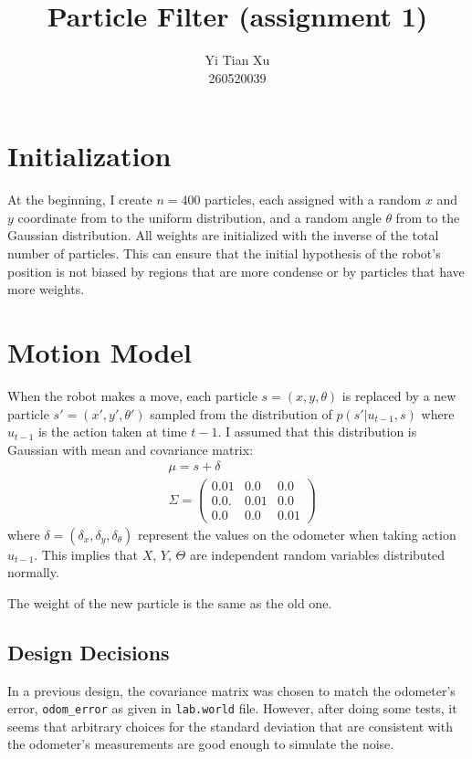 \documentclass[10pt]{article}
\title{Particle Filter (assignment 1)}
\author{Yi Tian Xu\\260520039}
\begin{document}
\maketitle

\section{Initialization}
At the beginning, I create $n=400$ particles, each assigned with a random $x$ and $y$ coordinate from to the uniform distribution, and a random angle $\theta$ from to the Gaussian distribution. All weights are initialized with the inverse of the total number of particles. This can ensure that the initial hypothesis of the robot's position is not biased by regions that are more condense or by particles that have more weights. 

\section{Motion Model}
When the robot makes a move, each particle $s = (x, y, \theta)$ is replaced by a new particle $s' = (x', y', \theta')$ sampled from the distribution of $p(s'|u_{t-1}, s)$ where $u_{t-1}$ is the action taken at time $t-1$. I assumed that this distribution is Gaussian with mean and covariance matrix:
\begin{align*}
	&\mu = s + \delta \\ 
	&\Sigma = \begin{pmatrix}
				0.01 & 0.0 & 0.0 \\
				0.0. & 0.01 & 0.0 \\
				0.0 & 0.0 & 0.01  \end{pmatrix} 
\end{align*}
where $\delta = (\delta_x, \delta_y, \delta_{\theta})$ represent the values on the odometer when taking action $u_{t-1}$. This implies that $X$, $Y$, $\Theta$ are independent random variables distributed normally. 

The weight of the new particle is the same as the old one. 

\subsection{Design Decisions}
In a previous design, the covariance matrix was chosen to match the odometer's error, \texttt{odom\_error} as given in \texttt{lab.world} file. However, after doing some tests, it seems that arbitrary choices for the standard deviation that are consistent with the odometer's measurements are good enough to simulate the noise. 
\end{document}
